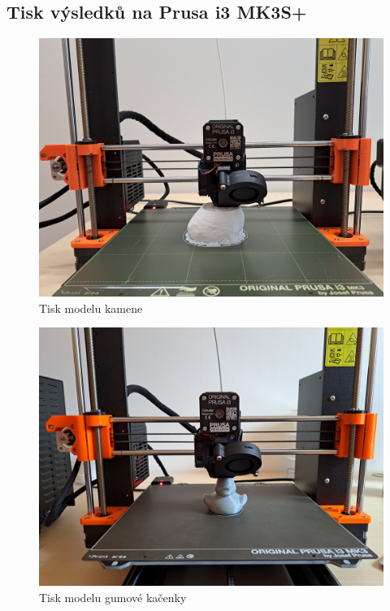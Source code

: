 \documentclass[12pt]{report}			%
\begin{document}
\begin{appendices}
    \chapter{Tisk výsledků na Prusa i3 MK3S+}
        \begin{figure}[h]
            \centering
            \includegraphics[width =\textwidth]{images/tisknutiKamene.jpg}
            \caption{Tisk modelu kamene}
        \end{figure}
       
        \begin{figure}[h]
            \centering
            \includegraphics[width =\textwidth]{images/tisknutiKachny.jpg}
            \caption{Tisk modelu gumové kačenky}
        \end{figure}
       

\end{appendices}
\end{document}
